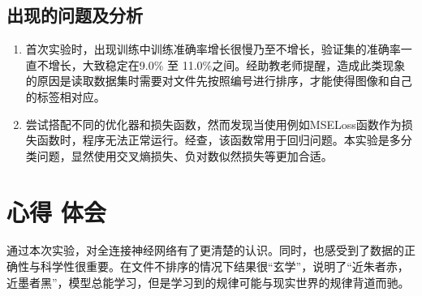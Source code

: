 \documentclass{report}
\begin{document}
	\subsection{出现的问题及分析}
	
	\begin{enumerate}
		\item 首次实验时，出现训练中训练准确率增长很慢乃至不增长，验证集的准确率一直不增长，大致稳定在9.0\% 至 11.0\%之间。经助教老师提醒，造成此类现象的原因是读取数据集时需要对文件先按照编号进行排序，才能使得图像和自己的标签相对应。
		
		\item 尝试搭配不同的优化器和损失函数，然而发现当使用例如MSELoss函数作为损失函数时，程序无法正常运行。经查，该函数常用于回归问题。本实验是多分类问题，显然使用交叉熵损失、负对数似然损失等更加合适。
	\end{enumerate}
	
	
	\section{心得 体会}
	通过本次实验，对全连接神经网络有了更清楚的认识。同时，也感受到了数据的正确性与科学性很重要。在文件不排序的情况下结果很“玄学”，说明了“近朱者赤，近墨者黑”，模型总能学习，但是学习到的规律可能与现实世界的规律背道而驰。
	
\end{document}
